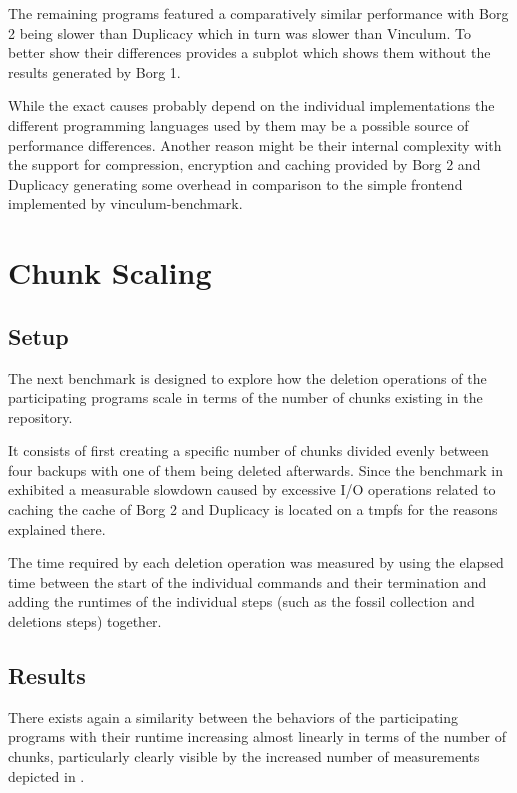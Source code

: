 The remaining programs featured a comparatively similar performance with Borg 2
being slower than Duplicacy which in turn was slower than Vinculum.
To better show their differences  provides a subplot which
shows them without the results generated by Borg 1.

While the exact causes probably depend on the individual implementations the
different programming languages used by them may be a possible source of
performance differences.
Another reason might be their internal complexity with the support for compression,
encryption and caching provided by Borg 2 and Duplicacy generating some overhead
in comparison to the simple frontend implemented by vinculum-benchmark.

\section{Chunk Scaling}

\subsection{Setup}

The next benchmark is designed to explore how the deletion operations of the
participating programs scale in terms of the number of chunks existing in the
repository.

It consists of first creating a specific number of chunks divided evenly between
four backups with one of them being deleted afterwards.
Since the benchmark in  exhibited a measurable
slowdown caused by excessive I/O operations related to caching the cache of Borg 2
and Duplicacy is located on a tmpfs for the reasons explained there.

The time required by each deletion operation was measured by using the elapsed
time between the start of the individual commands and their termination and
adding the runtimes of the individual steps (such as the fossil collection and
deletions steps) together.

\subsection{Results}

There exists again a similarity between the behaviors of the participating
programs with their runtime increasing almost linearly in terms of the number
of chunks, particularly clearly visible by the increased number of measurements
depicted in .


